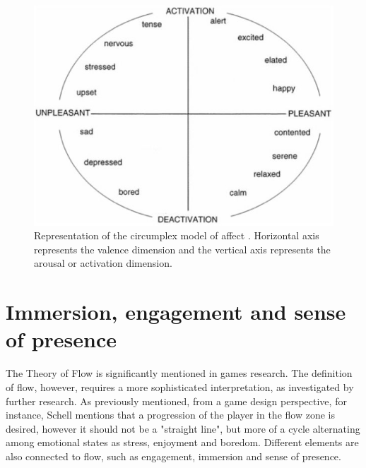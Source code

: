 \begin{figure}[h!]
    \centering
    \includegraphics[scale=0.6]{figures/russell-av.png}
    \caption{Representation of the circumplex model of affect \parencite{posner2005circumplex}. Horizontal axis represents the valence dimension and the vertical axis represents the arousal or activation dimension.}
    \label{fig:av-model}
\end{figure}


\section{Immersion, engagement and sense of presence}

The Theory of Flow is significantly mentioned in games research. The definition of flow, however, requires a more sophisticated interpretation, as investigated by further research. As previously mentioned, from a game design perspective, for instance, Schell \parencite{schell2014art} mentions that a progression of the player in the flow zone is desired, however it should not be a "straight line", but more of a cycle alternating among emotional states as stress, enjoyment and boredom. Different elements are also connected to flow, such as engagement, immersion and sense of presence.

